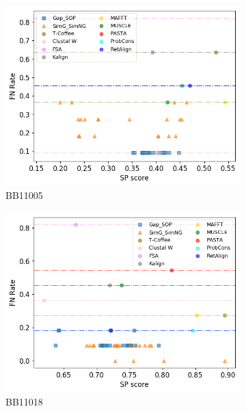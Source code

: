 \begin{figure}[!htbp]
\begin{adjustwidth}{-1cm}{-1cm}
\begin{subfigure}{0.22\textwidth}
			\includegraphics[width=\columnwidth]{Figure/summary/precomputedInit/Balibase/BB11005_fnrate_vs_sp_2}
			\caption{BB11005}
		\end{subfigure}	
		\begin{subfigure}{0.22\textwidth}
			\includegraphics[width=\columnwidth]{Figure/summary/precomputedInit/Balibase/BB11018_fnrate_vs_sp_2}
			\caption{BB11018}
		\end{subfigure}
		\begin{subfigure}{0.22\textwidth}

\end{subfigure}
\end{adjustwidth}
\end{figure}
